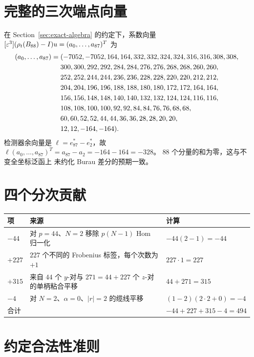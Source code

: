 \section{完整的三次端点向量}\label{app:vector}

在 Section~\ref{sec:exact-algebra} 的约定下，系数向量
$[\varepsilon^3](\rho_t(B_{88})-I)u=(a_0,\ldots,a_{87})^T$ 为
\begin{align}
(a_0,\ldots,a_{87})={}&(
-7052,-7052,164,164,332,332,324,324,316,316,308,308,\notag\\
&300,300,292,292,284,284,276,276,268,268,260,260,\notag\\
&252,252,244,244,236,236,228,228,220,220,212,212,\notag\\
&204,204,196,196,188,188,180,180,172,172,164,164,\notag\\
&156,156,148,148,140,140,132,132,124,124,116,116,\notag\\
&108,108,100,100,92,92,84,84,76,76,68,68,\notag\\
&60,60,52,52,44,44,36,36,28,28,20,20,\notag\\
&12,12,-164,-164).
\end{align}
检测器余向量是 $\ell=e_{87}^*-e_2^*$，故
$\ell(a_0,\ldots,a_{87})^T=a_{87}-a_2=-164-164=-328$。
$88$ 个分量的和为零，这与不变全坐标泛函上
未约化 Burau 差分的预期一致。

\section{四个分次贡献}\label{app:grading}

\begin{center}
\begin{tabular}{@{}p{}p{}p{}@{}}
\toprule
项 & 来源 & 计算 \\
\midrule
$-44$ & 对 $p=44$、$N=2$ 移除 $p(N-1)$ Hom 归一化 & $-44(2-1)=-44$\\
$+227$ & $227$ 个不同的 Frobenius 标签，每个次数为 $+1$ & $227\cdot1=227$\\
$+315$ & 来自 $44$ 个 $y$-对与 $271=44+227$ 个 $z$-对的单柄粘合平移 & $44+271=315$\\
$-4$ & 对 $N=2$、$\alpha=0$、$|r|=2$ 的缆线平移 & $(1-2)(2\cdot2+0)=-4$\\
\midrule
合计 & & $-44+227+315-4=494$\\
\bottomrule
\end{tabular}
\end{center}

\section{约定合法性准则}\label{app:legality}

